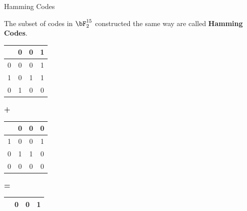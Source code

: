 \begin{frame}{Hamming Codes}
    
    The subset of codes in $\bF_2^{15}$ constructed the same way are called \textbf{Hamming Codes}.  \pause \\
    \vspace{0.5cm}
    \begin{minipage}{0.25\textwidth}
        \centering
        \begin{tabular}{|c|c|c|c|}
            \hline
            &  \cellcolor{red!20} 0 & \cellcolor{red!20} 0 & \cellcolor{blue!20}  1 \\ \hline
            \cellcolor{red!20} 0 & \cellcolor{blue!20} 0 & \cellcolor{blue!20}  0 & \cellcolor{blue!20} 1  \\ \hline
            \cellcolor{red!20} 1 & \cellcolor{blue!20} 0 &\cellcolor{blue!20}  1 &\cellcolor{blue!20} 1  \\ \hline
             \rowcolor{blue!20}0 & 1 & 0 & 0  \\ \hline
        \end{tabular}
    \end{minipage}
    \begin{minipage}{0.05\textwidth}
    \centering
        \textbf{+}
    \end{minipage}
    \begin{minipage}{0.25\textwidth}
    \centering
        \begin{tabular}{|c|c|c|c|}
            \hline
            &  \cellcolor{red!20} 0 & \cellcolor{red!20} 0 & \cellcolor{blue!20}  0 \\ \hline
            \cellcolor{red!20} 1 & \cellcolor{blue!20} 0 & \cellcolor{blue!20}  0 & \cellcolor{blue!20} 1  \\ \hline
            \cellcolor{red!20} 0 & \cellcolor{blue!20} 1 &\cellcolor{blue!20}  1 &\cellcolor{blue!20} 0  \\ \hline
             \rowcolor{blue!20}0 & 0 & 0 & 0  \\ \hline
        \end{tabular}
    \end{minipage}
    \begin{minipage}{0.05\textwidth}
    \centering
        \textbf{=}
    \end{minipage}
%
    \begin{minipage}{0.25\textwidth}
    \centering
        \begin{tabular}{|c|c|c|c|}
            \hline
            &  \cellcolor{red!20} 0 & \cellcolor{red!20} 0 & \cellcolor{blue!20}  1 \\ \hline

\end{tabular}
\end{minipage}
\end{frame}
